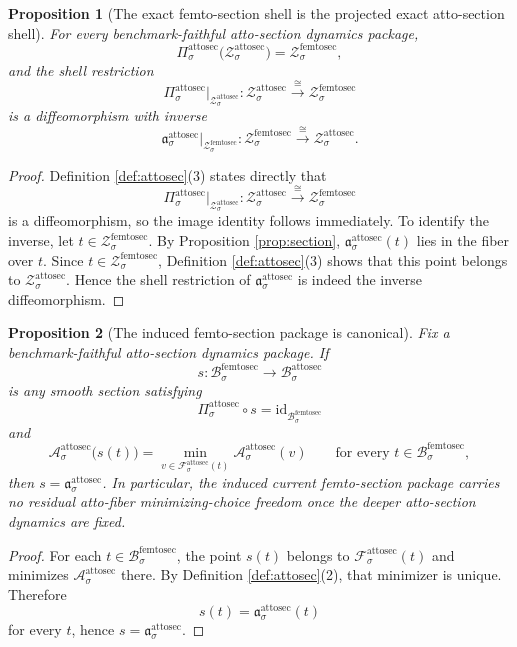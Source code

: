 \documentclass[11pt]{article}
\newcommand{\FemtoSectionBody}[1]{\mathcal B_{#1}^{\mathrm{femtosec}}}
\newcommand{\FemtoSectionShell}[1]{\mathcal Z_{#1}^{\mathrm{femtosec}}}
\newcommand{\AttoSectionBody}[1]{\mathcal B_{#1}^{\mathrm{attosec}}}
\newcommand{\AttoSectionProj}[1]{\Pi_{#1}^{\mathrm{attosec}}}
\newcommand{\AttoSectionFiber}[2]{\mathcal F_{#1}^{\mathrm{attosec}}(#2)}
\newcommand{\AttoSectionFemtoMin}[1]{\mathfrak a_{#1}^{\mathrm{attosec}}}
\newcommand{\AttoSectionFunctional}[1]{\mathscr A_{#1}^{\mathrm{attosec}}}
\newcommand{\AttoSectionShell}[1]{\mathcal Z_{#1}^{\mathrm{attosec}}}
\newtheorem{proposition}{Proposition}
\begin{document}
\begin{proposition}[The exact femto-section shell is the projected exact atto-section shell]
\label{prop:shell}
For every benchmark-faithful atto-section dynamics package,
\[
\AttoSectionProj{\sigma}\bigl(\AttoSectionShell{\sigma}\bigr)
=
\FemtoSectionShell{\sigma},
\]
and the shell restriction
\[
\AttoSectionProj{\sigma}\big|_{\AttoSectionShell{\sigma}}
:
\AttoSectionShell{\sigma}\xrightarrow{\cong}\FemtoSectionShell{\sigma}
\]
is a diffeomorphism with inverse
\[
\AttoSectionFemtoMin{\sigma}\big|_{\FemtoSectionShell{\sigma}}
:
\FemtoSectionShell{\sigma}\xrightarrow{\cong}\AttoSectionShell{\sigma}.
\]
\end{proposition}

\begin{proof}
Definition \ref{def:attosec}(3) states directly that
\[
\AttoSectionProj{\sigma}\big|_{\AttoSectionShell{\sigma}}
:
\AttoSectionShell{\sigma}\xrightarrow{\cong}\FemtoSectionShell{\sigma}
\]
is a diffeomorphism, so the image identity follows immediately. To identify the inverse, let \(t\in\FemtoSectionShell{\sigma}\). By Proposition \ref{prop:section}, \(\AttoSectionFemtoMin{\sigma}(t)\) lies in the fiber over \(t\). Since \(t\in\FemtoSectionShell{\sigma}\), Definition \ref{def:attosec}(3) shows that this point belongs to \(\AttoSectionShell{\sigma}\). Hence the shell restriction of \(\AttoSectionFemtoMin{\sigma}\) is indeed the inverse diffeomorphism.
\end{proof}

\begin{proposition}[The induced femto-section package is canonical]
\label{prop:canonical}
Fix a benchmark-faithful atto-section dynamics package. If
\[
s:\FemtoSectionBody{\sigma}\to\AttoSectionBody{\sigma}
\]
is any smooth section satisfying
\[
\AttoSectionProj{\sigma}\circ s
=
\mathrm{id}_{\FemtoSectionBody{\sigma}}
\]
and
\[
\AttoSectionFunctional{\sigma}\bigl(s(t)\bigr)
=
\min_{v\in\AttoSectionFiber{\sigma}{t}}
\AttoSectionFunctional{\sigma}(v)
\qquad
\text{for every }
t\in\FemtoSectionBody{\sigma},
\]
then \(s=\AttoSectionFemtoMin{\sigma}\). In particular, the induced current femto-section package carries no residual atto-fiber minimizing-choice freedom once the deeper atto-section dynamics are fixed.
\end{proposition}

\begin{proof}
For each \(t\in\FemtoSectionBody{\sigma}\), the point \(s(t)\) belongs to \(\AttoSectionFiber{\sigma}{t}\) and minimizes \(\AttoSectionFunctional{\sigma}\) there. By Definition \ref{def:attosec}(2), that minimizer is unique. Therefore
\[
s(t)=\AttoSectionFemtoMin{\sigma}(t)
\]
for every \(t\), hence \(s=\AttoSectionFemtoMin{\sigma}\).
\end{proof}
\end{document}
